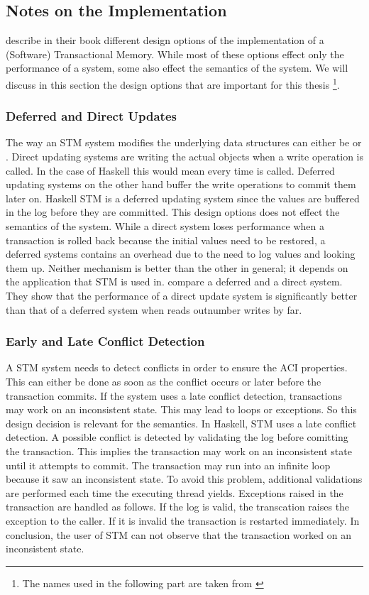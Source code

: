 \subsection{Notes on the Implementation}
\parencite[Chapter 2]{transBook} describe in their book different design options of the implementation of a 
(Software) Transactional Memory. While most of these options effect only the performance of a system, some also effect the 
semantics of the system. We will discuss in this section the design options that are important for this thesis \footnote{The names used in the 
following part are taken from \parencite[Chapter 2]{transBook}}.

\subsubsection{Deferred and Direct Updates} The way an STM system modifies the underlying data structures can either be 
or . Direct updating systems are writing the actual objects when a write operation is called. In the case of Haskell 
this would mean every time  is called. Deferred updating systems on the other hand buffer the write operations to
commit them later on. Haskell STM is a deferred updating system since the values are buffered in the log before they are
committed. This design options does not effect the semantics of the system. While a direct system loses performance when a transaction
is rolled back because the initial values need to be restored, a deferred systems contains an overhead due to the need to log values
and looking them up. Neither mechanism is better than the other in general; it depends on the application that STM is used in. 
\parencite{pessimisticSTM} compare a deferred and a direct system. They show that the performance of a direct update 
system is significantly better than that of a deferred system when reads outnumber writes by far.

\subsubsection{Early and Late Conflict Detection} A STM system needs to detect conflicts in order to ensure the ACI properties. This can 
either be done as soon as the conflict occurs or later before the transaction commits. If the system uses a late conflict 
detection, transactions may work on an inconsistent state. This may lead to loops or exceptions. So this design decision is 
relevant for the semantics. In Haskell, STM uses a late conflict detection. A possible conflict is detected by validating the log before 
comitting the transaction. This implies the transaction may work on an inconsistent state until it attempts to commit. The transaction 
may run into an infinite loop because it saw an inconsistent state. To avoid this problem, additional validations are performed
each time the executing thread yields. Exceptions raised in the transaction are handled as follows. If the log is valid,
the transcation raises the exception to the caller. If it is invalid the transaction is restarted immediately.
In conclusion, the user of STM can not observe that the transaction worked on an inconsistent state.

